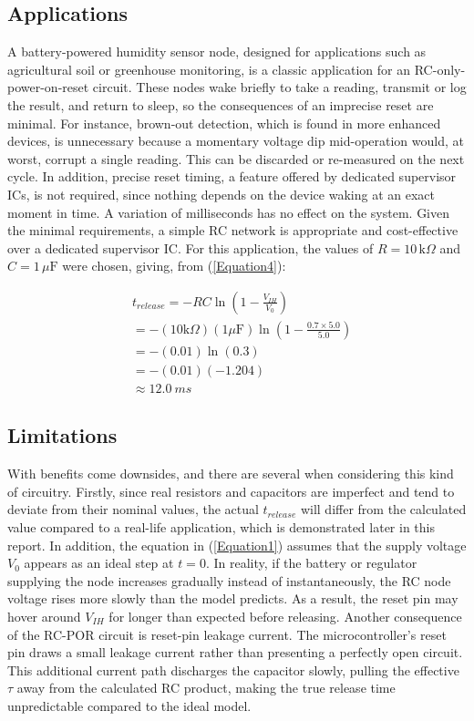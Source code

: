 \documentclass[conference]{IEEEtran}
\begin{document}
\subsection{Applications}
A battery-powered humidity sensor node, designed for applications such as agricultural soil or greenhouse monitoring, is a classic application for an RC-only-power-on-reset circuit.  These nodes wake briefly to take a reading, transmit or log the result, and return to sleep, so the consequences of an imprecise reset are minimal.  For instance, brown-out detection, which is found in more enhanced devices, is unnecessary because a momentary voltage dip mid-operation would, at worst, corrupt a single reading.  This can be discarded or re-measured on the next cycle.  In addition, precise reset timing, a feature offered by dedicated supervisor ICs, is not required, since nothing depends on the device waking at an exact moment in time.  A variation of milliseconds has no effect on the system.  Given the minimal requirements, a simple RC network is appropriate and cost-effective over a dedicated supervisor IC.  For this application, the values of $R = 10\,\text{k}\Omega$ and $C=1\,\text{$\mu$F}$ were chosen, giving, from (\ref{Equation4}):

\begin{equation}
    \begin{aligned}
        &t_{release}=-RC\ln{\left(1-\frac{V_{IH}}{V_0}\right)}\\
        &=-(10\text{k}\Omega)(1\text{$\mu$F})\ln{\left(1-\frac{0.7\times5.0}{5.0}\right)}\\
        &=-(0.01)\ln{(0.3)}\\
        &=-(0.01)(-1.204)\\
        &\approx12.0\ ms
    \end{aligned}
\end{equation}

 \subsection{Limitations}
 With benefits come downsides, and there are several when considering this kind of circuitry.  Firstly, since real resistors and capacitors are imperfect and tend to deviate from their nominal values, the actual $t_{release}$ will differ from the calculated value compared to a real-life application, which is demonstrated later in this report.  In addition, the equation in (\ref{Equation1}) assumes that the supply voltage $V_0$ appears as an ideal step at $t=0$.  In reality, if the battery or regulator supplying the node increases gradually instead of instantaneously, the RC node voltage rises more slowly than the model predicts.  As a result, the reset pin may hover around $V_{IH}$ for longer than expected before releasing.  Another consequence of the RC-POR circuit is reset-pin leakage current.  The microcontroller’s reset pin draws a small leakage current rather than presenting a perfectly open circuit.  This additional current path discharges the capacitor slowly, pulling the effective $\tau$ away from the calculated RC product, making the true release time unpredictable compared to the ideal model.
\end{document}
